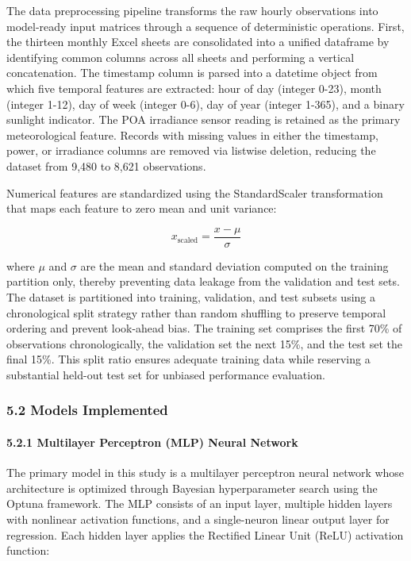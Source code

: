 \documentclass[
  11pt,
]{article}
\begin{document}
The data preprocessing pipeline transforms the raw hourly observations
into model-ready input matrices through a sequence of deterministic
operations. First, the thirteen monthly Excel sheets are consolidated
into a unified dataframe by identifying common columns across all sheets
and performing a vertical concatenation. The timestamp column is parsed
into a datetime object from which five temporal features are extracted:
hour of day (integer 0-23), month (integer 1-12), day of week (integer
0-6), day of year (integer 1-365), and a binary sunlight indicator. The
POA irradiance sensor reading is retained as the primary meteorological
feature. Records with missing values in either the timestamp, power, or
irradiance columns are removed via listwise deletion, reducing the
dataset from 9,480 to 8,621 observations.

Numerical features are standardized using the StandardScaler
transformation that maps each feature to zero mean and unit variance:

\[x_{\text{scaled}} = \frac{x - \mu}{\sigma}\]

where \(\mu\) and \(\sigma\) are the mean and standard deviation
computed on the training partition only, thereby preventing data leakage
from the validation and test sets. The dataset is partitioned into
training, validation, and test subsets using a chronological split
strategy rather than random shuffling to preserve temporal ordering and
prevent look-ahead bias. The training set comprises the first 70\% of
observations chronologically, the validation set the next 15\%, and the
test set the final 15\%. This split ratio ensures adequate training data
while reserving a substantial held-out test set for unbiased performance
evaluation.

\subsubsection{5.2 Models Implemented}\label{models-implemented}

\paragraph{5.2.1 Multilayer Perceptron (MLP) Neural
Network}\label{multilayer-perceptron-mlp-neural-network}

The primary model in this study is a multilayer perceptron neural
network whose architecture is optimized through Bayesian hyperparameter
search using the Optuna framework. The MLP consists of an input layer,
multiple hidden layers with nonlinear activation functions, and a
single-neuron linear output layer for regression. Each hidden layer
applies the Rectified Linear Unit (ReLU) activation function:
\end{document}
